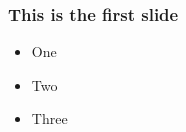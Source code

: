 \documentclass{beamer}
\begin{document}
\begin{frame}
  \frametitle{This is the first slide}
  \begin{itemize}
  \item One
  \item Two
  \item Three
  \end{itemize}
\end{frame}
\end{document}
